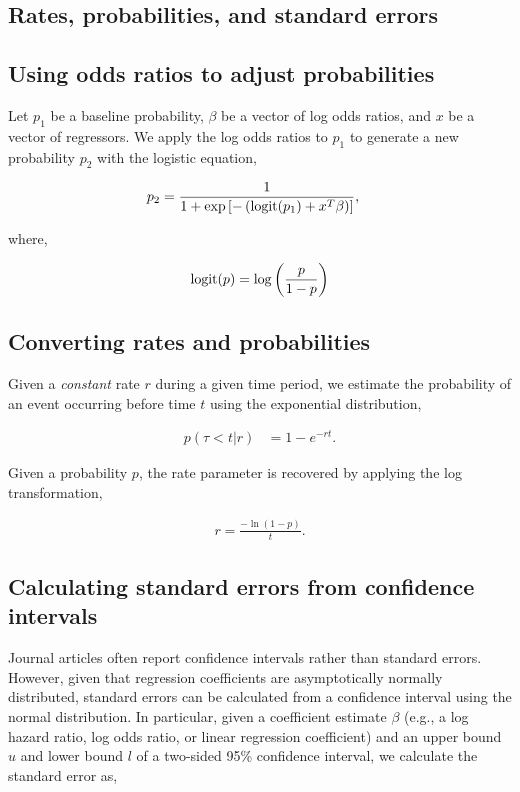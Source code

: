 \documentclass[11pt,final,fleqn]{article}\usepackage[]{graphicx}\usepackage[]{color}
\theoremstyle{plain}
\newcommand\logit{{\rm logit}}
\begin{document}
\begin{appendices}
\setcounter{table}{0}
\renewcommand{\thetable}{A\arabic{table}}
\setcounter{figure}{0}
\renewcommand{\thefigure}{A\arabic{figure}}
\setcounter{equation}{0}
\renewcommand{\theequation}{A\arabic{equation}}

\section{Rates, probabilities, and standard errors}\label{app:math}
\subsection{Using odds ratios to adjust probabilities}\label{app:odds-ratio-prob}
Let $p_1$ be a baseline probability, $\beta$ be a vector of log odds ratios, and $x$ be a vector of regressors. We apply the log odds ratios to $p_1$ to generate a new probability $p_2$ with the logistic equation,

\begin{align}
p_2 &= \frac{1}{1 + \exp\left[-\left(\logit(p_1) + x^T\beta \right)\right]},
\end{align}

where,

\begin{align}
\logit(p) = \log\left(\frac{p}{1-p}\right)
\end{align}

\subsection{Converting rates and probabilities}\label{app:rate-prob}
Given a \emph{constant} rate $r$ during a given time period, we estimate the probability of an event occurring before time $t$ using the exponential distribution,

\begin{align}
p(\tau < t |r) &= 1 - e^{-rt}.
\end{align}

Given a probability $p$, the rate parameter is recovered by applying the log transformation,

\begin{align}
r = \frac{-\ln(1-p)}{t}.
\end{align}

\subsection{Calculating standard errors from confidence intervals}\label{app:ci-se}
Journal articles often report confidence intervals rather than standard errors. However, given that regression coefficients are asymptotically normally distributed, standard errors can be calculated from a confidence interval using the normal distribution. In particular, given a coefficient estimate $\beta$ (e.g., a log hazard ratio, log odds ratio, or linear regression coefficient) and an upper bound $u$ and lower bound $l$ of a two-sided 95\% confidence interval, we calculate the standard error as,


\end{appendices}
\end{document}
